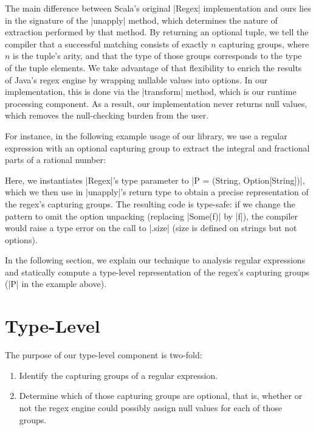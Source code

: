 The main difference between Scala's original |Regex| implementation and ours lies in the signature of the |unapply| method, which determines the nature of extraction performed by that method.
By returning an optional tuple, we tell the compiler that a successful matching consists of exactly $n$ capturing groups, where $n$ is the tuple's arity, and that the type of those groups corresponds to the type of the tuple elements.
We take advantage of that flexibility to enrich the results of Java's regex engine by wrapping nullable values into options.
In our implementation, this is done via the |transform| method, which is our
runtime processing component.
As a result, our implementation never returns null values, which removes the null-checking burden from the user.

For instance, in the following example usage of our library, we use a regular expression with an optional capturing group to extract the integral and fractional parts of a rational number:

\regexRational

\noindent
Here, we instantiates |Regex|'s type parameter to |P = (String, Option[String])|, which we then use in |unapply|'s return type to obtain a precise representation of the regex's capturing groups.
The resulting code is type-safe: if we change the pattern to omit the option unpacking (replacing |Some(f)| by |f|), the compiler would raise a type error on the call to |.size| (size is defined on strings but not options).

In the following section, we explain our technique to analysis regular expressions and statically compute a type-level representation of the regex's capturing groups (|P| in the example above).

\section{Type-Level}
\label{sec:type-level}

The purpose of our type-level component is two-fold:

\begin{enumerate}
  \item Identify the capturing groups of a regular expression.
  \item Determine which of those capturing groups are optional, that is, whether or not the regex engine could possibly assign null values for each of those groups.
\end{enumerate}


